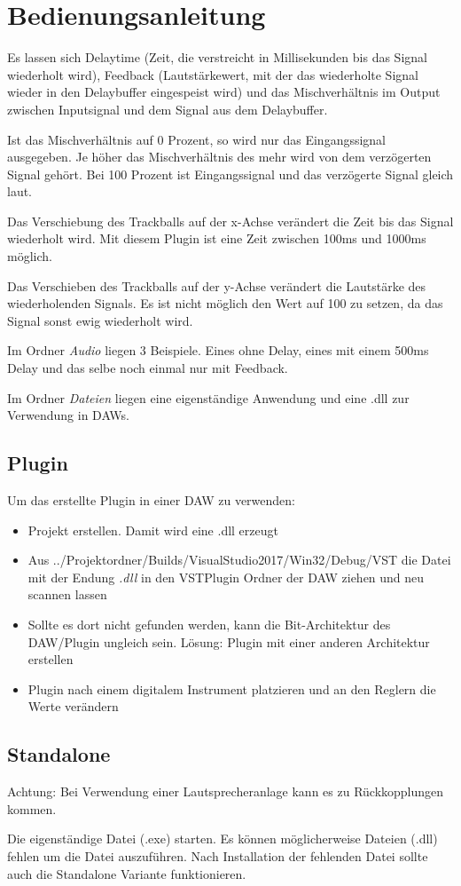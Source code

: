 \chapter{Bedienungsanleitung}


Es lassen sich Delaytime (Zeit, die verstreicht in Millisekunden bis das Signal wiederholt wird), Feedback (Lautstärkewert, mit der das wiederholte Signal wieder in den Delaybuffer eingespeist wird) und das Mischverhältnis im Output zwischen Inputsignal und dem Signal aus dem Delaybuffer.

Ist das Mischverhältnis auf 0 Prozent, so wird nur das Eingangssignal ausgegeben. Je höher das Mischverhältnis des mehr wird von dem verzögerten Signal gehört. Bei 100 Prozent ist Eingangssignal und das verzögerte Signal gleich laut.

Das Verschiebung des Trackballs auf der x-Achse verändert die Zeit bis das Signal wiederholt wird. Mit diesem Plugin ist eine Zeit zwischen 100ms und 1000ms möglich.

Das Verschieben des Trackballs auf der y-Achse verändert die Lautstärke des wiederholenden Signals. Es ist nicht möglich den Wert auf 100 zu setzen, da das Signal sonst ewig wiederholt wird.

Im Ordner \textit{Audio} liegen 3 Beispiele. Eines ohne Delay, eines mit einem 500ms Delay und das selbe noch einmal nur mit Feedback.

Im Ordner \textit{Dateien} liegen eine eigenständige Anwendung und eine .dll zur Verwendung in DAWs.


\section{Plugin}

Um das erstellte Plugin in einer DAW zu verwenden:

\begin{itemize}
	\item Projekt erstellen. Damit wird eine .dll erzeugt
	\item Aus ../Projektordner/Builds/VisualStudio2017/Win32/Debug/VST die Datei mit der Endung \textit{.dll} in den VSTPlugin Ordner der DAW ziehen und neu scannen lassen
	\item Sollte es dort nicht gefunden werden, kann die Bit-Architektur des DAW/Plugin ungleich sein. Lösung: Plugin mit einer anderen Architektur erstellen
	\item Plugin nach einem digitalem Instrument platzieren und an den Reglern die Werte verändern
\end{itemize}

\section{Standalone}

Achtung: Bei Verwendung einer Lautsprecheranlage kann es zu Rückkopplungen kommen.

Die eigenständige Datei (.exe) starten. Es können möglicherweise Dateien (.dll) fehlen um die Datei auszuführen. Nach Installation der fehlenden Datei sollte auch die Standalone Variante funktionieren. 